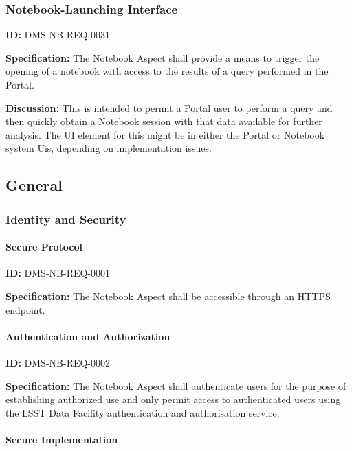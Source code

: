 \documentclass[SE,toc]{lsstdoc}
\begin{document}
\subsubsection{Notebook-Launching Interface}

\label{DMS-NB-REQ-0031}
\textbf{ID:} DMS-NB-REQ-0031

\textbf{Specification:}
The Notebook Aspect shall provide a means to trigger the opening of a notebook with access to the results of a query performed in the Portal.

\textbf{Discussion:}
This is intended to permit a Portal user to perform a query and then quickly obtain a Notebook session with that data available for further analysis.  The UI element for this might be in either the Portal or Notebook system Uis, depending on implementation issues.

\subsection{General}

\subsubsection{Identity and Security}

\paragraph{Secure Protocol}\hfill  %

\label{DMS-NB-REQ-0001}
\textbf{ID:} DMS-NB-REQ-0001

\textbf{Specification:}
The Notebook Aspect shall be accessible through an HTTPS endpoint.

\paragraph{Authentication and Authorization}\hfill  %

\label{DMS-NB-REQ-0002}
\textbf{ID:} DMS-NB-REQ-0002

\textbf{Specification:}
The Notebook Aspect shall authenticate users for the purpose of establishing authorized use and only permit access to authenticated users using the LSST Data Facility authentication and authorisation service.

\paragraph{Secure Implementation}\hfill  %
\end{document}
